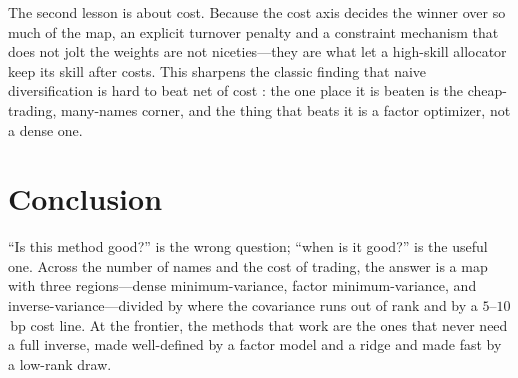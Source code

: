 \documentclass[11pt]{article}
\begin{document}
The second lesson is about cost. Because the cost axis decides the winner over so
much of the map, an explicit turnover penalty and a constraint mechanism that does
not jolt the weights are not niceties---they are what let a high-skill allocator
keep its skill after costs. This sharpens the classic finding that naive
diversification is hard to beat net of cost \parencite{demiguel2009}: the one
place it is beaten is the cheap-trading, many-names corner, and the thing
that beats it is a factor optimizer, not a dense one.

\section{Conclusion}
``Is this method good?'' is the wrong question; ``when is it good?'' is the
useful one. Across the number of names and the cost of trading, the answer is a
map with three regions---dense minimum-variance, factor minimum-variance, and
inverse-variance---divided by where the covariance runs out of rank and by a
$5$--$10$\,bp cost line. At the frontier, the methods that work are the ones that
never need a full inverse, made well-defined by a factor model and a ridge and
made fast by a low-rank draw.

\printbibliography
\end{document}
